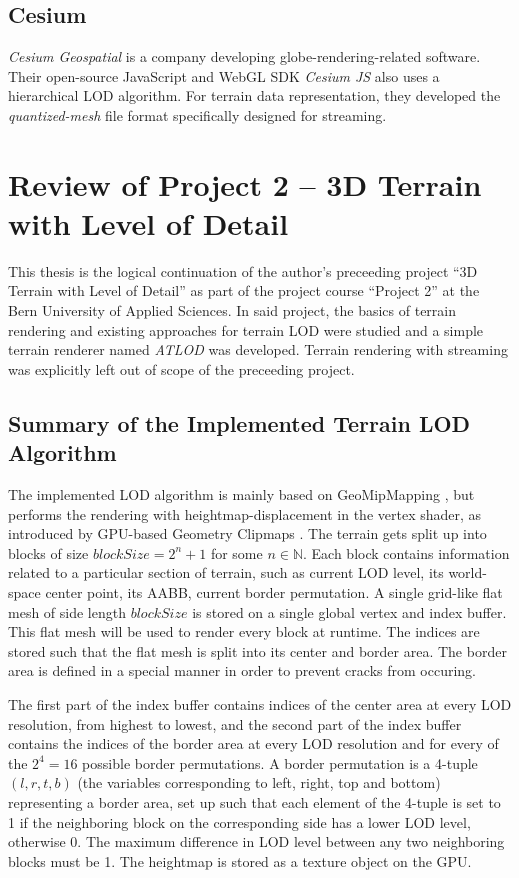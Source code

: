 \subsection{Cesium}
\textit{Cesium Geospatial} is a company developing 
globe-rendering-related software.
Their open-source JavaScript and WebGL SDK 
\textit{Cesium JS} also uses a hierarchical 
LOD algorithm. For terrain data representation, they developed the
\textit{quantized-mesh} file format 
specifically designed for streaming.

\section{Review of Project 2 -- 3D Terrain with Level of Detail}
This thesis is the logical continuation of 
the author's preceeding project ``3D Terrain with Level of Detail'' \cite{p2}
as part of the project course ``Project 2'' at the Bern University of Applied Sciences.
In said project, the basics of terrain rendering and existing approaches for terrain LOD were 
studied and a simple terrain renderer named \textit{ATLOD} was developed.
Terrain rendering with streaming was explicitly left out of scope of the preceeding project.

\subsection{Summary of the Implemented Terrain LOD Algorithm}
The implemented LOD algorithm is mainly based on GeoMipMapping \cite{geomipmapping},
but performs the rendering with heightmap-displacement in the vertex shader,
as introduced by GPU-based Geometry Clipmaps \cite{gpugeomclipmaps}.
The terrain gets split up into blocks of size $blockSize = 2^n + 1$ for some $n \in \mathbb{N}$.
Each block contains information related to a particular section of terrain, such as current LOD level, its world-space center point, 
its AABB, current border permutation.
A single grid-like flat mesh of side length $blockSize$ is stored on a single global vertex and index buffer.
This flat mesh will be used to render every block at runtime.
The indices are stored such that the flat mesh is split into its center and border area. 
The border area is defined in a special manner in order to prevent cracks from occuring.

The first part of the index buffer 
contains indices of the center area at every LOD resolution, from highest to lowest, 
and the second part of the index buffer contains the indices of the border area 
at every LOD resolution and for every of the $2^4=16$ possible border permutations. 
A border permutation is a 4-tuple $(l,r,t,b)$ (the variables corresponding to left, right, top and bottom) 
representing a border area, set up such that each element of the 4-tuple is set to 1 if the neighboring block 
on the corresponding side has a lower LOD level, otherwise 0. The maximum difference 
in LOD level between any two neighboring blocks must be 1.
The heightmap is stored as a texture object on the GPU.

